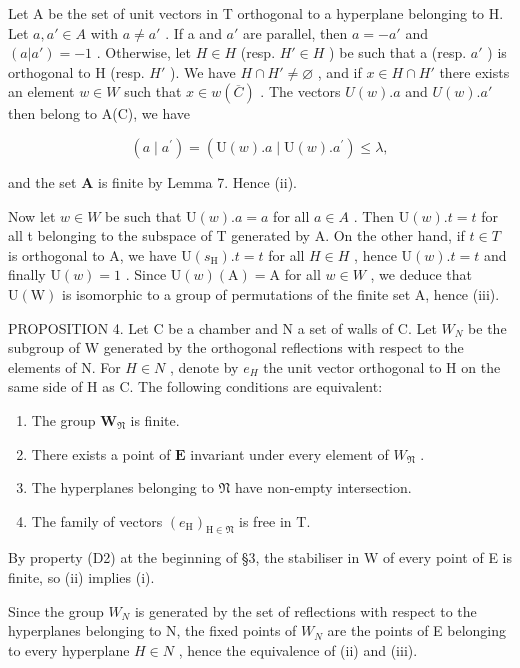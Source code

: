 Let A be the set of unit vectors in T orthogonal to a hyperplane belonging to H. Let \(a, a' \in A\) with \(a \neq a'\) . If a and \(a'\) are parallel, then \(a = -a'\) and \((a|a') = -1\) . Otherwise, let \(H \in H\) (resp. \(H' \in H\) ) be such that a (resp. \(a'\) ) is orthogonal to H (resp. \(H'\) ). We have \(H \cap H' \neq \varnothing\) , and if \(x \in H \cap H'\) there exists an element \(w \in W\) such that \(x \in w(\overline{C})\) . The vectors \(U(w).a\) and \(U(w).a'\) then belong to A(C), we have

\[
(a \mid a ^ {\prime}) = (\mathrm{U} (w). a \mid \mathrm{U} (w). a ^ {\prime}) \leqslant \lambda ,
\]

and the set \(\mathbf{A}\) is finite by Lemma 7. Hence (ii).

Now let \(w \in W\) be such that \(\mathrm{U}(w).a = a\) for all \(a \in A\) . Then \(\mathrm{U}(w).t = t\) for all t belonging to the subspace of T generated by A. On the other hand, if \(t \in T\) is orthogonal to A, we have \(\mathrm{U}(s_{\mathrm{H}}).t = t\) for all \(H \in H\) , hence \(\mathrm{U}(w).t = t\) and finally \(\mathrm{U}(w) = 1\) . Since \(\mathrm{U}(w)(\mathrm{A}) = \mathrm{A}\) for all \(w \in W\) , we deduce that \(\mathrm{U}(\mathrm{W})\) is isomorphic to a group of permutations of the finite set A, hence (iii).

PROPOSITION 4. Let C be a chamber and N a set of walls of C. Let \(W_{N}\) be the subgroup of W generated by the orthogonal reflections with respect to the elements of N. For \(H \in N\) , denote by \(e_{H}\) the unit vector orthogonal to H on the same side of H as C. The following conditions are equivalent:

\begin{enumerate}
\def\labelenumi{(\roman{enumi})}
\item
  The group \(\mathbf{W}_{\mathfrak{N}}\) is finite.
\item
  There exists a point of \(\mathbf{E}\) invariant under every element of \(W_{\mathfrak{N}}\) .
\item
  The hyperplanes belonging to \(\mathfrak{N}\) have non-empty intersection.
\item
  The family of vectors \((e_{\mathrm{H}})_{\mathrm{H}\in \mathfrak{N}}\) is free in T.
\end{enumerate}

By property (D2) at the beginning of §3, the stabiliser in W of every point of E is finite, so (ii) implies (i).

Since the group \(W_{N}\) is generated by the set of reflections with respect to the hyperplanes belonging to N, the fixed points of \(W_{N}\) are the points of E belonging to every hyperplane \(H \in N\) , hence the equivalence of (ii) and (iii).

